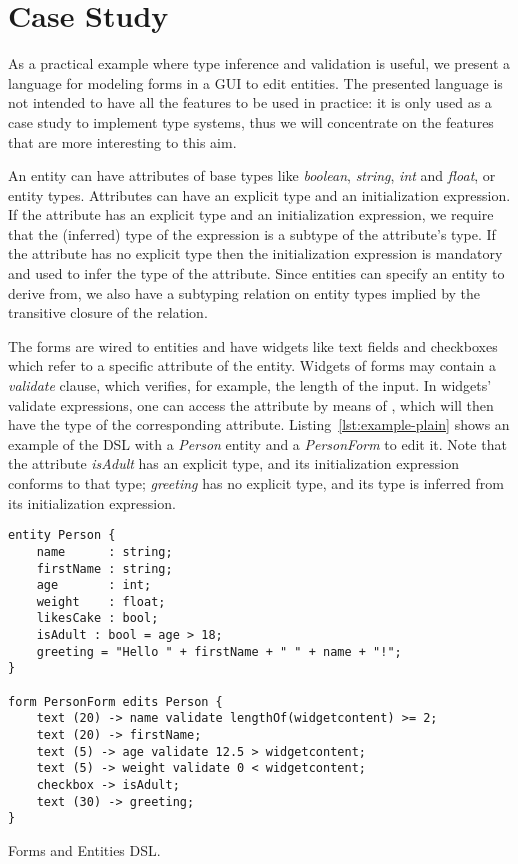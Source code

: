\section{Case Study}
\label{sec:casestudy}

As a practical example where type inference and validation is useful, we present
a language for modeling forms in a GUI to edit entities.  The
presented language is not intended to have all the features to be used in
practice: it is only used as a case study to implement type systems, thus we
will concentrate on the features that are more interesting to this aim.

An entity can have attributes of base types like \emph{boolean}, \emph{string},
\emph{int} and \emph{float}, or entity types.
Attributes can have an explicit type and an initialization expression.
If the attribute has an explicit type and an initialization expression, we
require that the (inferred) type of the expression is a subtype of the
attribute's type. If the attribute has no explicit type then the initialization
expression is mandatory and used to infer the type of the attribute.
Since entities can specify an entity to derive from, we also have a subtyping
relation on entity types implied by the transitive closure of the
 relation.

The forms are wired to entities and have widgets like text fields and
checkboxes which refer to a specific attribute of the entity.
Widgets of forms may contain a \emph{validate} clause, which verifies, for
example, the length of the input.
In widgets' validate expressions, one can access the attribute by means of
, which will then have the type of the corresponding
attribute.  Listing~\ref{lst:example-plain} shows an example of the DSL with a
\emph{Person} entity and a \emph{PersonForm} to edit it. Note that the attribute
\emph{isAdult} has an explicit type, and its initialization expression
conforms to that type; \emph{greeting} has no explicit type, and its type is
inferred from its initialization expression.

%

\begin{listing}[tb]
\begin{multicols}{2}
\begin{lstlisting}[language=guidsl] 
entity Person {
	name      : string;
	firstName : string;
	age       : int; 
	weight    : float;
	likesCake : bool; 
	isAdult : bool = age > 18;
	greeting = "Hello " + firstName + " " + name + "!";
}

form PersonForm edits Person {
	text (20) -> name validate lengthOf(widgetcontent) >= 2;
	text (20) -> firstName;
	text (5) -> age validate 12.5 > widgetcontent;
	text (5) -> weight validate 0 < widgetcontent;
	checkbox -> isAdult;
	text (30) -> greeting;
}
\end{lstlisting}
\end{multicols}
\caption{Forms and Entities DSL.}
\label{lst:example-plain}
\end{listing}

